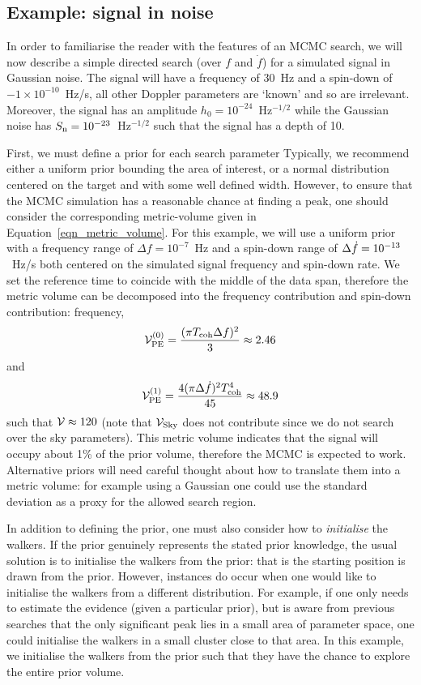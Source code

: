 \documentclass[aps, prd, twocolumn, superscriptaddress, floatfix, showpacs, nofootinbib, longbibliography]{revtex4-1}
\begin{document}
\subsection{Example: signal in noise}

In order to familiarise the reader with the features of an MCMC search, we will
now describe a simple directed search (over $f$ and $\dot{f}$) for a simulated
signal in Gaussian noise. The signal will have a frequency of $30$~Hz and a
spin-down of $-1{\times}10^{-10}$~Hz/s, all other Doppler parameters are
`known' and so are irrelevant. Moreover, the signal has an amplitude
$h_0=10^{-24}$~Hz$^{-1/2}$ while the Gaussian noise has
$S_{\rm n}=10^{-23}$~Hz$^{-1/2}$ such that the signal has a depth of 10.

First, we must define a prior for each search parameter Typically, we recommend
either a uniform prior bounding the area of interest, or a normal distribution
centered on the target and with some well defined width. However, to ensure
that the MCMC simulation has a reasonable chance at finding a peak, one should
consider the corresponding metric-volume given in
Equation~\eqref{eqn_metric_volume}. For this example, we will use a uniform
prior with a frequency range of $\Delta f = 10^{-7}$~Hz and a spin-down range
of $\Delta \dot{f}=10^{-13}$~Hz/s both centered on the simulated signal frequency
and spin-down rate. We set the reference time to coincide with the middle of
the data span, therefore the metric volume can be decomposed into the frequency
contribution and spin-down contribution:
frequency,
\begin{align}
\mathcal{V}_{\rm PE}^{(0)} = \frac{(\pi T_{\rm coh}\Delta f)^2}{3} \approx 2.46
\end{align}
and
\begin{align}
\mathcal{V}_{\rm PE}^{(1)} = \frac{4(\pi\Delta \dot{f})^2T_{\rm coh}^{4}}{45} \approx 48.9
\end{align}
such that $\mathcal{V}\approx120$ (note that $\mathcal{V}_{\rm Sky}$ does not contribute since we do
not search over the sky parameters). This metric volume indicates that the
signal will occupy about 1\% of the prior volume, therefore the MCMC is
expected to work. Alternative priors will need careful thought about how to
translate them into a metric volume: for example using a Gaussian one could use
the standard deviation as a proxy for the allowed search region.

In addition to defining the prior, one must also consider how to
\emph{initialise} the walkers. If the prior genuinely represents the stated
prior knowledge, the usual solution is to initialise the walkers from the
prior: that is the starting position is drawn from the prior. However,
instances do occur when one would like to initialise the walkers from a
different distribution. For example, if one only needs to estimate the evidence
(given a particular prior), but is aware from previous searches that the only
significant peak lies in a small area of parameter space, one could initialise
the walkers in a small cluster close to that area. In this example, we
initialise the walkers from the prior such that they have the chance to explore
the entire prior volume.
\end{document}
